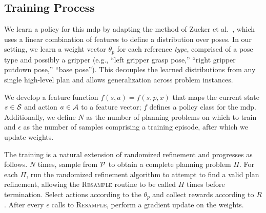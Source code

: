 
\subsection{Training Process}
We learn a policy for this {\sc mdp} by adapting the method of Zucker et al.~\cite{workspacebias}, which
uses a linear combination of features to define a distribution over poses. In our setting, we learn a weight
vector $\theta_{p}$ for each reference \emph{type}, comprised of a pose type and possibly a gripper
(e.g., ``left gripper grasp pose,'' ``right gripper putdown pose,'' ``base pose'').
This decouples the learned distributions from any single high-level plan and allows generalization across problem instances.

We develop a feature function $f(s, a) = f(s, p, x)$ that maps the current
state $s \in \mathcal{S}$ and action $a \in \mathcal{A}$ to a
feature vector; $f$ defines a policy class for the {\sc mdp}. Additionally, we define
$N$ as the number of planning problems on which to train and
$\epsilon$ as the number of samples comprising a training episode, after which we update weights.

The training is a natural extension of randomized
refinement and progresses as follows. $N$ times, sample from $\mathcal{P}$ to obtain
a complete planning problem $\Pi$. For each $\Pi$, run the randomized refinement
algorithm to attempt to find a valid plan refinement, allowing the \textsc{Resample}
routine to be called $H$ times before termination. Select actions according to the $\theta_{p}$
and collect rewards according to $R$. After every $\epsilon$ calls to
\textsc{Resample}, perform a gradient update on the weights.

